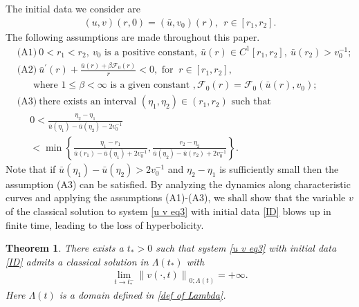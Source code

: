 \documentclass[10pt,leqno]{amsart}
\numberwithin{equation}{section}
\newtheorem{thm}{Theorem}[section]
\begin{document}
The initial data we consider are
\begin{equation} \label{ID}
	\begin{aligned}
		(u,v) (r,0) = (\bar{u},v_0)(r), \ \ r \in [r_1,r_2].
	\end{aligned}
\end{equation}
The following assumptions are made throughout this paper.
\begin{equation} \label{assumption}
	\begin{aligned}
		& \text{(A1)}\ 	0 < r_1 < r_2, \ v_0 \text{ is a positive constant}, \ \bar{u} (r) \in C^1 [r_1,r_2] , \ \bar{u}(r_2) >v_{0}^{-1}; \\
		& \text{(A2)} \ \bar{u}^{\prime} (r)+\frac{\bar{u} (r)+ \beta \mathcal{F}_{0}(r) }{r} < 0, \text{ for } \ r\in [r_1,r_2], \\
		& \ \ \ \ \ \ \text{ where }1 \leq \beta<\infty \text{ is a given constant }, \mathcal{F}_{0}(r) = \mathcal{F}_{0} (\bar{u}(r),v_{0});\\
		&\text{(A3)} \ \text{there exists an interval }	(\eta_1,\eta_2) \in (r_1,r_2) 	\text{ such that } \\
		& \ \ \ \ \ \ 0 < \frac{\eta_2-\eta_1}{\bar{u} (\eta_1) - \bar{u} (\eta_2) - 2v_{0}^{-1}} \\
		& \ \ \ \ \ \ < \min \left\lbrace \frac{\eta_1-r_1}{\bar{u} (r_1) - \bar{u} (\eta_1) + 2v_{0}^{-1}},\frac{r_2 -\eta_2}{\bar{u} (\eta_2) - \bar{u} (r_2) + 2v_{0}^{-1}} \right\rbrace .
	\end{aligned}
\end{equation}
Note that if $\bar{u} (\eta_1) - \bar{u} (\eta_2) > 2v_{0}^{-1}$ and $\eta_2-\eta_1$ is sufficiently small then the assumption (A3) can be satisfied. By analyzing the dynamics along characteristic curves and applying the assumptions (A1)-(A3), we shall show that the variable
$v$ of the classical solution to system \eqref{u v eq3} with initial data \eqref{ID} blows up in finite time, leading to the loss of hyperbolicity.


\begin{thm} \label{main thm}
	There exists a $t_{*}>0$ such that system \eqref{u v eq3} with initial data \eqref{ID} admits a classical solution in $\Lambda(t_{*})$ with
	\begin{equation} \label{thm infty} 
		\begin{aligned}
			\lim\limits_{t \rightarrow t_{*}^{-}} \left\| v (\cdot,t) \right\|_{0;\Lambda(t)} = + \infty. 
		\end{aligned}
	\end{equation}	
	Here $\Lambda(t)$ is a domain defined in \eqref{def of Lambda}.
	
\end{thm}
\end{document}
